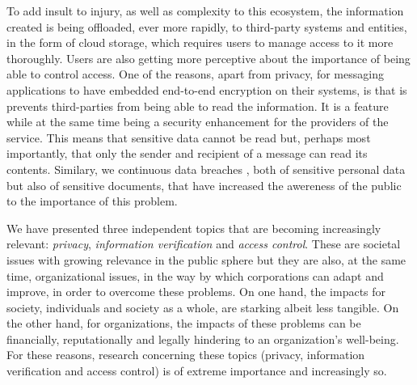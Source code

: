 To add insult to injury, as well as complexity to this ecosystem, the information created is being offloaded, ever more rapidly, to third-party systems and entities, in the form of cloud storage, which requires users to manage access to it more thoroughly. Users are also getting more perceptive about the importance of being able to control access. One of the reasons, apart from privacy, for messaging applications to have embedded end-to-end encryption on their systems, is that is prevents third-parties from being able to read the information. It is a feature while at the same time being a security enhancement for the providers of the service. This means that sensitive data cannot be read but, perhaps most importantly, that only the sender and recipient of a message can read its contents. Similary, we continuous data breaches \cite{edwards_hype_2016}, both of sensitive personal data but also of sensitive documents, that have increased the awereness of the public to the importance of this problem.

We have presented three independent topics that are becoming increasingly relevant: \textit{privacy}, \textit{information verification} and \textit{access control}. These are societal issues with growing relevance in the public sphere but they are also, at the same time, organizational issues, in the way by which corporations can adapt and improve, in order to overcome these problems. On one hand, the impacts for society, individuals and society as a whole, are starking albeit less tangible. On the other hand, for organizations, the impacts of these problems can be financially, reputationally and legally hindering to an organization's well-being. For these reasons, research concerning these topics (privacy, information verification and access control) is of extreme importance and increasingly so.

